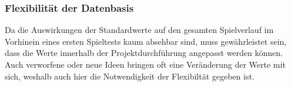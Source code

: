 \subsubsection{Flexibilität der Datenbasis}
\label{subsub:spielwelt-datenbasis-einleitung-fleibilität}

Da die Auswirkungen der Standardwerte auf den gesamten Spielverlauf im Vorhinein eines ersten Spieltests kaum absehbar sind, muss gewährleistet sein, dass die Werte innerhalb der Projektdurchführung angepasst werden können. Auch verworfene oder neue Ideen bringen oft eine Veränderung der Werte mit sich, weshalb auch hier die Notwendigkeit der Flexibiltät gegeben ist.

